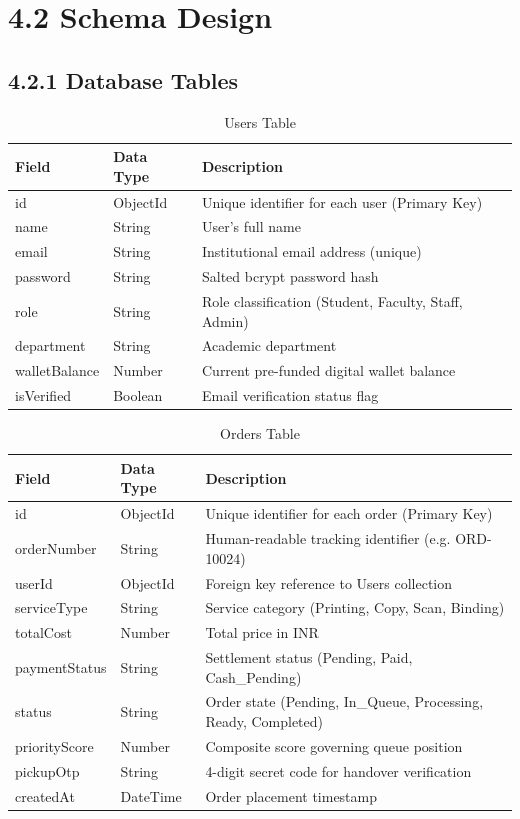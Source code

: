 \documentclass[12pt,a4paper]{report}
\begin{document}
\section{4.2 Schema Design}

\subsection{4.2.1 Database Tables}

\begin{table}[H]
\centering
\small
\caption{Users Table}
\label{tab:users}
\begin{tabular}{|p{1.2in}|p{1.2in}|p{3.2in}|}
\hline
\textbf{Field} & \textbf{Data Type} & \textbf{Description} \\ \hline
id & ObjectId & Unique identifier for each user (Primary Key) \\ \hline
name & String & User's full name \\ \hline
email & String & Institutional email address (unique) \\ \hline
password & String & Salted bcrypt password hash \\ \hline
role & String & Role classification (Student, Faculty, Staff, Admin) \\ \hline
department & String & Academic department \\ \hline
walletBalance & Number & Current pre-funded digital wallet balance \\ \hline
isVerified & Boolean & Email verification status flag \\ \hline
\end{tabular}
\end{table}

\begin{table}[H]
\centering
\small
\caption{Orders Table}
\label{tab:orders}
\begin{tabular}{|p{1.2in}|p{1.2in}|p{3.2in}|}
\hline
\textbf{Field} & \textbf{Data Type} & \textbf{Description} \\ \hline
id & ObjectId & Unique identifier for each order (Primary Key) \\ \hline
orderNumber & String & Human-readable tracking identifier (e.g. ORD-10024) \\ \hline
userId & ObjectId & Foreign key reference to Users collection \\ \hline
serviceType & String & Service category (Printing, Copy, Scan, Binding) \\ \hline
totalCost & Number & Total price in INR \\ \hline
paymentStatus & String & Settlement status (Pending, Paid, Cash\_Pending) \\ \hline
status & String & Order state (Pending, In\_Queue, Processing, Ready, Completed) \\ \hline
priorityScore & Number & Composite score governing queue position \\ \hline
pickupOtp & String & 4-digit secret code for handover verification \\ \hline
createdAt & DateTime & Order placement timestamp \\ \hline
\end{tabular}
\end{table}
\end{document}
